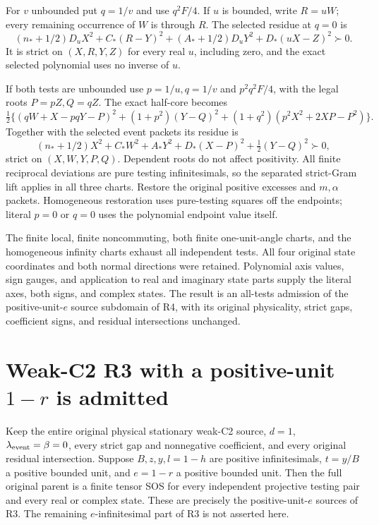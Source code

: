 For $v$ unbounded put $q=1/v$ and use $q^2F/4$. If $u$ is bounded,
write $R=uW$; every remaining occurrence of $W$ is through $R$.
The selected residue at $q=0$ is
\[
 (n_*+1/2)D_uX^2+C_*(R-Y)^2
       +(A_*+1/2)D_uY^2+D_*(uX-Z)^2\succ0.           \tag{R4E15}
\]
It is strict on $(X,R,Y,Z)$ for every real $u$, including zero,
and the exact selected polynomial uses no inverse of $u$.

If both tests are unbounded use $p=1/u,q=1/v$ and $p^2q^2F/4$,
with the legal roots $P=pZ,Q=qZ$. The exact half-core becomes
\[
 \tfrac12\{(qW+X-pqY-P)^2+(1+p^2)(Y-Q)^2
                       +(1+q^2)(p^2X^2+2XP-P^2)\}.
\]
Together with the selected event packets its residue is
\[
 (n_*+1/2)X^2+C_*W^2+A_*Y^2+D_*(X-P)^2
                                  +\tfrac12(Y-Q)^2\succ0,       \tag{R4E16}
\]
strict on $(X,W,Y,P,Q)$. Dependent roots do not affect positivity.
All finite reciprocal deviations are pure testing infinitesimals,
so the separated strict-Gram lift applies in all three charts.
Restore the original positive excesses and $m,\alpha$ packets.
Homogeneous restoration uses pure-testing squares off the endpoints;
literal $p=0$ or $q=0$ uses the polynomial endpoint value itself.

The finite local, finite noncommuting, both finite one-unit-angle
charts, and the homogeneous infinity charts exhaust all independent
tests. All four original state coordinates and both normal directions
were retained. Polynomial axis values, sign gauges, and application to
real and imaginary state parts supply the literal axes, both signs,
and complex states. The result is an all-tests admission of the
positive-unit-$e$ source subdomain of R4, with its original physicality,
strict gaps, coefficient signs, and residual intersections unchanged.


\section{\texorpdfstring{Weak-C2 R3 with a positive-unit $1-r$ is admitted}{Weak-C2 R3 with a positive-unit 1-r is admitted}}
\label{component:p1c9902e9a6f2}

\label{p1c9902e9a6f2:sec:r18-r3-eunit}

\begin{theorem}
Keep the entire original physical stationary weak-C2 source, $d=1$,
$\lambda_{\rm event}=\beta=0$, every strict gap and nonnegative
coefficient, and every original residual intersection. Suppose
$B,z,y,l=1-h$ are positive infinitesimals, $t=y/B$ a positive bounded
unit, and $e=1-r$ a positive bounded unit. Then the full original
parent is a finite tensor SOS for every independent projective testing
pair and every real or complex state. These are precisely the
positive-unit-$e$ sources of R3. The remaining $e$-infinitesimal
part of R3 is not asserted here.
\end{theorem}

